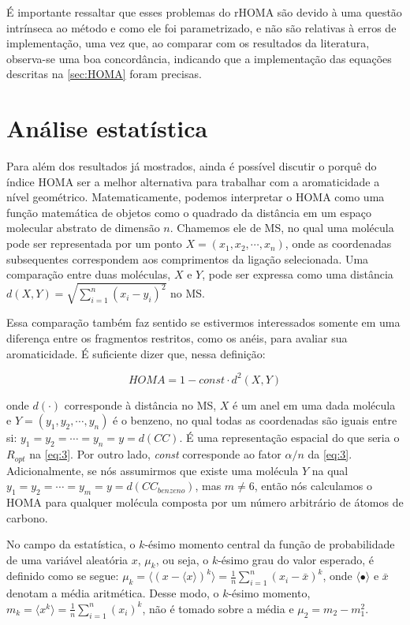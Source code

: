 \noindent É importante ressaltar que esses problemas do \gls{rHOMA} são devido à uma questão intrínseca ao método e como ele foi parametrizado, e não são relativas à erros de implementação, uma vez que, ao comparar com os resultados da literatura, observa-se uma boa concordância, indicando que a implementação das equações descritas na \autoref{sec:HOMA} foram precisas.

\section{Análise estatística}

Para além dos resultados já mostrados, ainda é possível discutir o porquê do índice \gls{HOMA} ser a melhor alternativa para trabalhar com a aromaticidade a nível geométrico. Matematicamente, podemos interpretar o \gls{HOMA} como uma função matemática de objetos como o quadrado da distância em um espaço molecular abstrato de dimensão $n$. Chamemos ele de \gls{MS}, no qual uma molécula pode ser representada por um ponto $X = (x_1, x_2, \cdots, x_n)$, onde as coordenadas subsequentes correspondem aos comprimentos da ligação  selecionada. Uma comparação entre duas moléculas, $X$ e $Y$, pode ser expressa como uma distância $d(X, Y) = \displaystyle \sqrt{\sum_{i=1}^{n} (x_i - y_i)^2}$ no \gls{MS}. 

Essa comparação também faz sentido se estivermos interessados somente em uma diferença entre os fragmentos restritos, como os anéis, para avaliar sua aromaticidade. É suficiente dizer que, nessa definição:

\begin{equation}
    HOMA = 1 - \textit{const} \cdot d^2(X, Y)
\end{equation}

\noindent onde $d(\cdot)$ corresponde à distância no \gls{MS}, $X$ é um anel em uma dada molécula e $Y = (y_1, y_2, \cdots, y_n)$ é o benzeno, no qual todas as coordenadas são iguais entre si: $y_1 = y_2 = \cdots = y_n = y = d(CC)$. É uma representação espacial do que seria o $R_{opt}$ na \autoref{eq:3}. Por outro lado, \textit{const} corresponde ao fator $\alpha / n$ da \autoref{eq:3}. Adicionalmente, se nós assumirmos que existe uma molécula $Y$ na qual $y_1 = y_2 = \cdots = y_m = y = d(CC_{benzeno})$, mas $m \neq 6$, então nós calculamos o \gls{HOMA} para qualquer molécula composta por um número arbitrário de átomos de carbono.

No campo da estatística, o $k$-ésimo momento central da função de probabilidade de uma variável aleatória $x$, $\mu_k$, ou seja, o $k$-ésimo grau do valor esperado, é definido como se segue: $\mu_k = \langle (x - \langle x \rangle)^k \rangle = \displaystyle \frac{1}{n} \sum_{i = 1}^n (x_i - \bar{x})^k$, onde $\langle \bullet \rangle$ e $\bar{x}$ denotam a média aritmética.
Desse modo, o $k$-ésimo momento, $m_k = \langle x^k \rangle = \displaystyle \frac{1}{n} \sum_{i=1}^n (x_i)^k$, não é tomado sobre a média e $\mu_2 = m_2 - m_1^2$.

